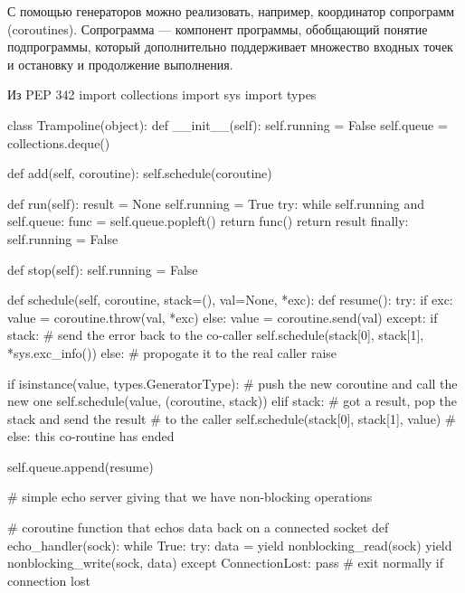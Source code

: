 С помощью генераторов можно реализовать, например, координатор сопрограмм (coroutines). Сопрограмма --- компонент программы, обобщающий понятие подпрограммы, который дополнительно поддерживает множество входных точек и остановку и продолжение выполнения.
\begin{pylst}{Из PEP 342}{}
import collections
import sys
import types

class Trampoline(object):
    def __init__(self):
        self.running = False
        self.queue = collections.deque()

    def add(self, coroutine):
        self.schedule(coroutine)

    def run(self):
        result = None
        self.running = True
        try:
            while self.running and self.queue:
                func = self.queue.popleft()
                return func()
            return result
        finally:
            self.running = False

    def stop(self):
        self.running = False

    def schedule(self, coroutine, stack=(), val=None, *exc):
        def resume():
            try:
                if exc:
                    value = coroutine.throw(val, *exc)
                else:
                    value = coroutine.send(val)
            except:
                if stack:
                    # send the error back to the co-caller
                    self.schedule(stack[0], stack[1], *sys.exc_info())
                else:
                    # propogate it to the real caller
                    raise

            if isinstance(value, types.GeneratorType):
                # push the new coroutine and call the new one
                self.schedule(value, (coroutine, stack))
            elif stack:
                # got a result, pop the stack and send the result
                # to the caller
                self.schedule(stack[0], stack[1], value)
            # else: this co-routine has ended

        self.queue.append(resume)

# simple echo server giving that we have non-blocking operations

# coroutine function that echos data back on a connected socket
def echo_handler(sock):
    while True:
        try:
            data = yield nonblocking_read(sock)
            yield nonblocking_write(sock, data)
        except ConnectionLost:
            pass  # exit normally if connection lost


\end{pylst}
